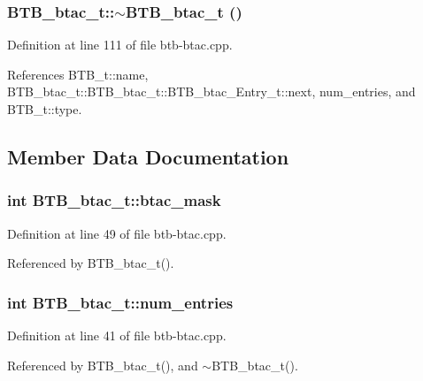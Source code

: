 \subsubsection[{$\sim$BTB\_\-btac\_\-t}]{\setlength{\rightskip}{0pt plus 5cm}BTB\_\-btac\_\-t::$\sim$BTB\_\-btac\_\-t ()\hspace{0.3cm}{\tt  [inline]}}\label{classBTB__btac__t_65dcc2cf26ada35a1efa071dcea28b4e}




Definition at line 111 of file btb-btac.cpp.

References BTB\_\-t::name, BTB\_\-btac\_\-t::BTB\_\-btac\_\-t::BTB\_\-btac\_\-Entry\_\-t::next, num\_\-entries, and BTB\_\-t::type.

\subsection{Member Data Documentation}
\subsubsection[{btac\_\-mask}]{\setlength{\rightskip}{0pt plus 5cm}int {\bf BTB\_\-btac\_\-t::btac\_\-mask}\hspace{0.3cm}{\tt  [protected]}}\label{classBTB__btac__t_4edf7639bee62f9e4fc1484673b7be34}




Definition at line 49 of file btb-btac.cpp.

Referenced by BTB\_\-btac\_\-t().
\subsubsection[{num\_\-entries}]{\setlength{\rightskip}{0pt plus 5cm}int {\bf BTB\_\-btac\_\-t::num\_\-entries}\hspace{0.3cm}{\tt  [protected]}}\label{classBTB__btac__t_f9c6785dfbbfe6517e180e09d016e395}




Definition at line 41 of file btb-btac.cpp.

Referenced by BTB\_\-btac\_\-t(), and $\sim$BTB\_\-btac\_\-t().
